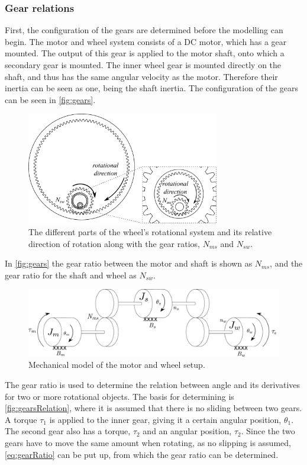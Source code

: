 \subsubsection{Gear relations}
First, the configuration of the gears are determined before the modelling can begin. The motor and wheel system consists of a DC motor, which has a gear mounted. The output of this gear is applied to the motor shaft, onto which a secondary gear is mounted. The inner wheel gear is mounted directly on the shaft, and thus has the same angular velocity as the motor. Therefore their inertia can be seen as one, being the shaft inertia. The configuration of the gears can be seen in \autoref{fig:gears}.
\begin{figure}[H]
\centering
\includegraphics[width=0.75\textwidth]{figures/gears.pdf}
\caption{The different parts of the wheel's rotational system and its relative direction of rotation along with the gear ratios, $N_{ms}$ and $N_{sw}$.}
\label{fig:gears}
\end{figure}
In \autoref{fig:gears} the gear ratio between the motor and shaft is shown as $N_{ms}$, and the gear ratio for the shaft and wheel as $N_{sw}$.
\begin{figure}[H]
\centering
\includegraphics[width=\textwidth]{figures/motorRotationalDiagram.pdf}
\caption{Mechanical model of the motor and wheel setup.}
\label{fig:motorRotational}
\end{figure}

The gear ratio is used to determine the relation between angle and its derivatives for two or more rotational objects. The basis for determining is \autoref{fig:gearsRelation}, where it is assumed that there is no sliding between two gears. A torque $\tau_1$ is applied to the inner gear, giving it a certain angular position, $\theta_1$. The second gear also has a torque, $\tau_2$ and an angular position, $\tau_2$. Since the two gears have to move the same amount when rotating, as no slipping is assumed, \autoref{eq:gearRatio} can be put up, from which the gear ratio can be determined.

